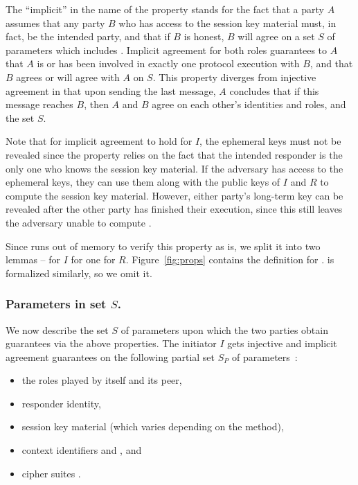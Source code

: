 The ``implicit'' in the name of the property stands for the fact that a party
$A$ assumes that any party $B$ who has access to the session key material
\mSessKey{} must, in fact, be the intended party, and that if $B$ is honest,
$B$ will agree on a set $S$ of parameters which includes \mSessKey.
%
Implicit agreement for both roles guarantees to $A$ that $A$ is or has been
involved in exactly one protocol execution with $B$, and that $B$ agrees or
will agree with $A$ on $S$.
%
This property diverges from injective agreement in that upon sending
the last message, $A$ concludes that if this message reaches $B$, then $A$
and $B$ agree on each other's identities and roles, and the set $S$.
%

Note that for implicit agreement to hold for $I$, the ephemeral keys must not
be revealed since the property relies on the fact that the intended responder
is the only one who knows the session key material.
%
If the adversary has access to the ephemeral keys, they can use them along 
with
the public keys of $I$ and $R$ to compute the session key material.
%
However, either party's long-term key can be revealed after the other
party has finished their execution, since this still leaves the adversary
unable to compute \mGxy{}.
%

Since \mTamarin{} runs out of memory to verify this property as is,
we split it into two lemmas -- \mPredImpI{} for $I$ for one \mPredImpR{} for 
$R$.
%
Figure~\ref{fig:props} contains the definition for \mPredImpI{}.
%
\mPredImpR{} is formalized similarly, so we omit it.
%

\subsubsection{Parameters in set $S$.}
\label{sec:agreedParams}
We now describe the set $S$ of parameters upon which the two parties obtain
guarantees via the above properties.
%
The initiator $I$ gets injective and implicit agreement guarantees on the
following partial set $S_P$ of parameters~\cite{Norr21}:
\begin{itemize}
    \item the roles played by itself and its peer,
    \item responder identity,
    \item session key material (which varies depending on the \mEdhoc{} 
method),
    \item context identifiers \mCi{} and \mCr{}, and
    \item cipher suites \mSuites{}.
\end{itemize}
%

